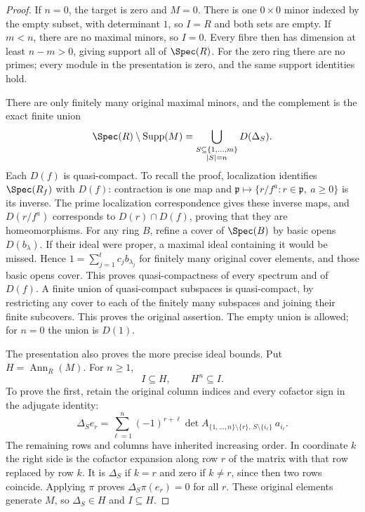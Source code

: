 \begin{proof}
If $n=0$, the target is zero and $M=0$. There is one
$0\times0$ minor indexed by the empty subset, with
determinant $1$, so $I=R$ and both sets are empty.
If $m<n$, there are no maximal minors, so $I=0$.
Every fibre then has dimension at least $n-m>0$, giving
support all of $\Spec(R)$. For the zero ring there are
no primes; every module in the presentation is zero,
and the same support identities hold.

There are only finitely many original maximal minors,
and the complement is the exact finite union
$$
\Spec(R)\setminus\operatorname{Supp}(M)
=\bigcup_{\substack{S\subseteq\{1,\ldots,m\}\\|S|=n}}D(\Delta_S).
$$
Each $D(f)$ is quasi-compact. To recall the proof,
localization identifies $\Spec(R_f)$ with $D(f)$:
contraction is one map and
$\mathfrak p\mapsto\{r/f^a:r\in\mathfrak p,\ a\geq0\}$
is its inverse. The prime localization correspondence
gives these inverse maps, and $D(r/f^a)$ corresponds
to $D(r)\cap D(f)$, proving that they are homeomorphisms.
For any ring $B$, refine a cover of $\Spec(B)$ by
basic opens $D(b_\lambda)$. If their ideal were proper,
a maximal ideal containing it would be missed. Hence
$1=\sum_{j=1}^t c_jb_{\lambda_j}$ for finitely many
original cover elements, and those basic opens cover.
This proves quasi-compactness of every spectrum and
of $D(f)$. A finite union of quasi-compact subspaces
is quasi-compact, by restricting any cover to each
of the finitely many subspaces and joining their finite
subcovers. This proves the original assertion. The
empty union is allowed; for $n=0$ the union is $D(1)$.

\medskip\noindent
The presentation also proves the more precise ideal
bounds. Put $H=\operatorname{Ann}_R(M)$. For $n\geq1$,
$$
I\subseteq H,\qquad H^n\subseteq I.
$$
To prove the first, retain the original column indices
and every cofactor sign in the adjugate identity:
$$
\Delta_Se_r
=\sum_{\ell=1}^n(-1)^{r+\ell}
\det A_{\{1,\ldots,n\}\setminus\{r\},\,
S\setminus\{i_\ell\}}\ a_{i_\ell}.
$$
The remaining rows and columns have inherited increasing
order. In coordinate $k$ the right side is the cofactor
expansion along row $r$ of the matrix with that row
replaced by row $k$. It is $\Delta_S$ if $k=r$ and
zero if $k\ne r$, since then two rows coincide.
Applying $\pi$ proves $\Delta_S\pi(e_r)=0$ for all
$r$. These original elements generate $M$, so
$\Delta_S\in H$ and $I\subseteq H$.


\end{proof}
